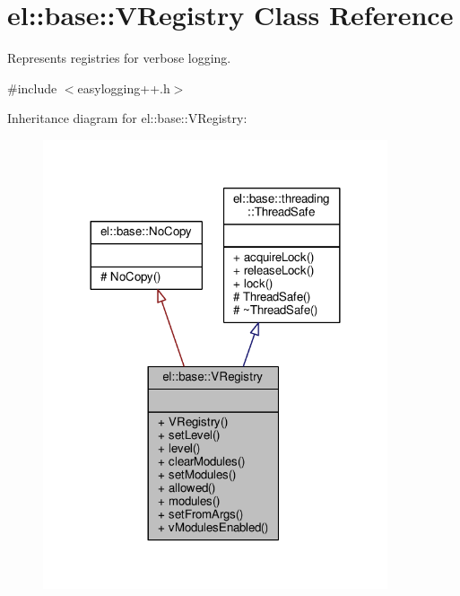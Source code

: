 \hypertarget{classel_1_1base_1_1VRegistry}{}\section{el\+:\+:base\+:\+:V\+Registry Class Reference}
\label{classel_1_1base_1_1VRegistry}


Represents registries for verbose logging.  




{\ttfamily \#include $<$easylogging++.\+h$>$}



Inheritance diagram for el\+:\+:base\+:\+:V\+Registry\+:
\nopagebreak
\begin{figure}[H]
\begin{center}
\leavevmode
\includegraphics[width=288pt]{da/d67/classel_1_1base_1_1VRegistry__inherit__graph}
\end{center}
\end{figure}


